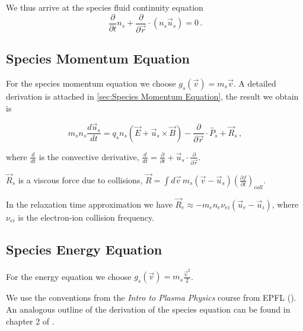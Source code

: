 We thus arrive at the species fluid continuity equation
\begin{equation*}
    \frac{\partial}{\partial t} n_s + \frac{\partial}{\partial \vec{r}} \cdot (n_s \vec{u}_s) = 0 \, .
\end{equation*}



\subsection{Species Momentum Equation}
For the species momentum equation we choose $g_s(\vec{v}) = m_s \vec{v}$.
A detailed derivation is attached in \autoref{sec:Species Momentum Equation}, the result we obtain is

\begin{equation}\label{eq: species momentum eq}
 m_s n_s \frac{d \vec{u}_s}{d t} = q_s n_s \left(\vec{E} + \vec{u}_s \times \vec{B}\right) - \frac{\partial}{\partial \vec{r}} \cdot \overleftrightarrow{P_s} + \vec{R}_s  \, ,
\end{equation}

where $\frac{d}{dt}$ is the convective derivative, $\frac{d}{dt} = \frac{\partial}{\partial t} + \vec{u}_s \cdot \frac{\partial}{\partial \vec{r}}$.

$\vec{R}_s$ is a viscous force due to collisions, $\vec{R} = \int d\vec{v} \, m_s (\vec{v} - \vec{u}_s) \left(\frac{\partial f}{\partial t}\right)_{coll} $.

In the relaxation time approximation we have $\vec{R}_e \approx -m_e n_e \nu_{ei} (\vec{u}_e - \vec{u}_i)$,
where $\nu_{ei}$ is the electron-ion collision frequency.

\subsection{Species Energy Equation}
For the energy equation we choose $g_s(\vec{v}) = m_s \frac{\vec{v}^2}{2}$.

We use the conventions from the \emph{Intro to Plasma Physics} course from EPFL (\cite{epfl_plasma_intro}).
An analogous outline of the derivation of the species equation can be found
in chapter 2 of \cite{Freidberg2014}.


